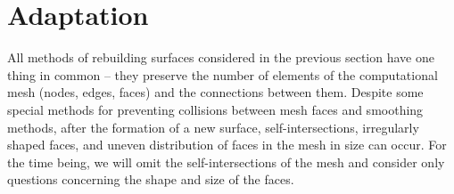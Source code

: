 \documentclass[
11pt,%
tightenlines,%
twoside,%
onecolumn,%
nofloats,%
nobibnotes,%
nofootinbib,%
superscriptaddress,%
noshowpacs,%
centertags]%
{revtex4-2}
\begin{document}

\section{Adaptation}

All methods of rebuilding surfaces considered in the previous section have one thing in common -- they preserve the number of elements of the computational mesh (nodes, edges, faces) and the connections between them.
Despite some special methods for preventing collisions between mesh faces and smoothing methods, after the formation of a new surface, self-intersections, irregularly shaped faces, and uneven distribution of faces in the mesh in size can occur.
For the time being, we will omit the self-intersections of the mesh and consider only questions concerning the shape and size of the faces.
\end{document}
